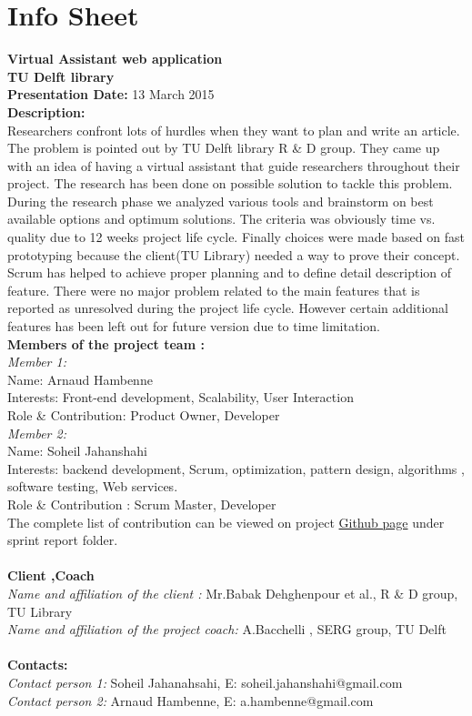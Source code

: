 \chapter{Info Sheet}    
\textbf{Virtual Assistant web application\\}
\textbf{\small{TU Delft library\\}}
\textbf{Presentation Date: } 13 March 2015\\ 
\bigskip
\textbf{Description: \\}
 Researchers confront lots of hurdles when they want to plan and write an article. The problem is pointed out by TU Delft library R \& D group. They came up with an idea of having a virtual assistant that guide researchers throughout their project. The research has been done on possible solution to tackle this problem. During the research phase we analyzed various tools and brainstorm on best available options and optimum solutions. The criteria was obviously time vs. quality due to 12 weeks project life cycle. Finally choices were made based on fast prototyping because the client(TU Library) needed a way to prove their concept. Scrum has helped to achieve proper planning and to define detail description of feature. There were no major problem related to the main features that is reported as unresolved during the project life cycle. However certain additional features has been left out for future version due to time limitation.\\  
 \bigskip
 \textbf{Members of the project team :\\}
  \textit{Member 1: \\}
	Name: Arnaud Hambenne\\
	Interests: Front-end development, Scalability, User Interaction\\ 
	Role \& Contribution: Product Owner, Developer\\
   \textit{Member 2: \\}
   Name: Soheil Jahanshahi\\
   Interests: backend development, Scrum, optimization, pattern design, algorithms , software testing, Web services.\\ 
   Role \& Contribution : Scrum Master, Developer\\
 The complete list of contribution can be viewed on project \href{https://github.com/solix/Virtual.Assistant.TU.Library/tree/master/Documentation/Sprint%20Reports}{Github page} under sprint report folder.\\\\
\textbf{Client ,Coach \\}
\textit{Name and affiliation of the client : } Mr.Babak Dehghenpour et al., R \& D group, TU Library\\
\textit{Name and affiliation of the project coach:} A.Bacchelli , SERG group, TU Delft \\\\
\textbf{Contacts: \\}
\textit{Contact person 1: } Soheil Jahanahsahi, E: soheil.jahanshahi@gmail.com \\
\textit{Contact person 2: } Arnaud Hambenne, E: a.hambenne@gmail.com 


